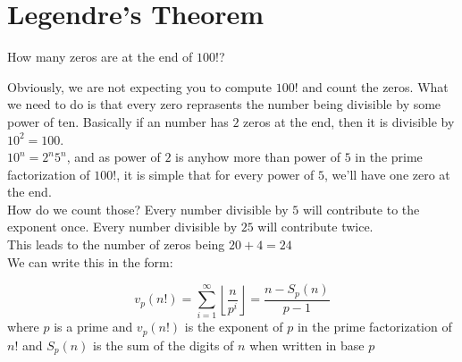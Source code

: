 \section{Legendre’s Theorem}
\begin{example}
How many zeros are at the end of $100!$?
\end{example}
Obviously, we are not expecting you to compute $100!$ and count the zeros. What we need to do is that every zero reprasents the number being divisible by some power of ten. Basically if an number has $2$ zeros at the end, then it is divisible by $10^2=100$. \\
$10^n=2^n 5^n$, and as power of $2$ is anyhow more than power of $5$ in the prime factorization of $100!$, it is simple that for every power of $5$, we'll have one zero at the end.\\
How do we count those? Every number divisible by $5$ will contribute to the exponent once. Every number divisible by $25$ will contribute twice.\\
This leads to the number of zeros being $20+4=24$\\
We can write this in the form:
\begin{theorem}
\[v_p(n!)=\sum_{i=1}^{\infty} \left\lfloor \dfrac{n}{p^i}\right\rfloor =\frac{n-S_{p}(n)}{p-1}\]
where $p$ is a prime and $v_p(n!)$ is the exponent of $p$ in the prime factorization of $n!$ and $S_p(n)$ is the sum of the digits of $n$ when written in base $p$
\end{theorem}
